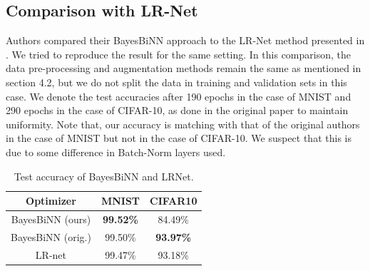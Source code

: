 \subsection{Comparison with LR-Net}
Authors compared their BayesBiNN approach to the LR-Net method presented in \cite{r8}. We tried to reproduce the result for the same setting. In this comparison, the data pre-processing and augmentation methods remain the same as mentioned in section 4.2, but we do not split the data in training and validation sets in this case. We denote the test accuracies after 190 epochs in the case of MNIST and 290 epochs in the case of CIFAR-10, as done in the original paper to maintain uniformity. Note that, our accuracy is matching with that of the original authors in the case of MNIST but not in the case of CIFAR-10. We suspect that this is due to some difference in Batch-Norm layers used.

\begin{table}[h]
\begin{center}
\renewcommand{\arraystretch}{1.1}
\begin{tabular}{ | c | c | c |}
\hline
 Optimizer & MNIST &  CIFAR10 \\ \hline
   BayesBiNN (ours) & \textbf{99.52\%} & 84.49\% \\ \hline
   BayesBiNN (orig.) & 99.50\% & \textbf{93.97\%} \\ \hline
   LR-net \cite{r8} & 99.47\% & 93.18\% \\
\hline
\end{tabular}
\caption{Test accuracy of BayesBiNN and LRNet.}
\label{tab:LR_result_2}
\end{center}
\end{table}

